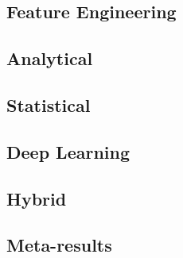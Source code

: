\subsection{Feature Engineering}


\subsection{Analytical}

\subsection{Statistical}

\subsection{Deep Learning}

\subsection{Hybrid}

\subsection{Meta-results}
